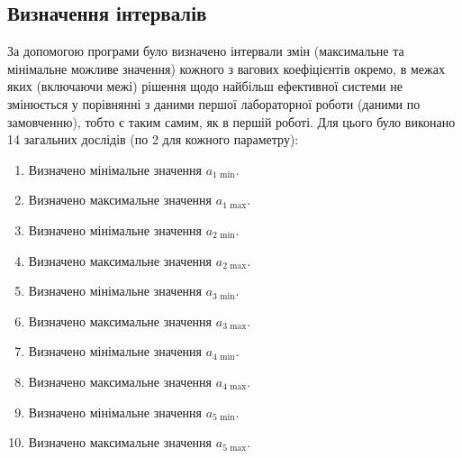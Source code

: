 \subsection{Визначення інтервалів}

За допомогою програми було визначено інтервали змін (максимальне та мінімальне можливе значення)
кожного з вагових коефіцієнтів окремо, в межах яких (включаючи межі) рішення щодо найбільш
ефективної системи не змінюється у порівнянні з даними першої лабораторної роботи (даними по
замовченню), тобто є таким самим, як в першій роботі. Для цього було виконано 14 загальних дослідів
(по 2 для кожного параметру):

\begin{enumerate}
\item Визначено мінімальне значення $a_{1 \text{ min}}$.
\item Визначено максимальне значення $a_{1 \text{ max}}$.
\item Визначено мінімальне значення $a_{2 \text{ min}}$.
\item Визначено максимальне значення $a_{2 \text{ max}}$.
\item Визначено мінімальне значення $a_{3 \text{ min}}$.
\item Визначено максимальне значення $a_{3 \text{ max}}$.
\item Визначено мінімальне значення $a_{4 \text{ min}}$.
\item Визначено максимальне значення $a_{4 \text{ max}}$.
\item Визначено мінімальне значення $a_{5 \text{ min}}$.
\item Визначено максимальне значення $a_{5 \text{ max}}$.
\end{enumerate}

